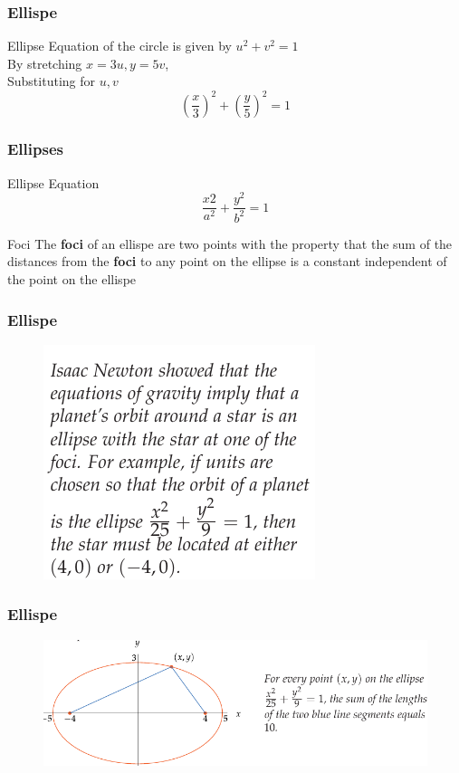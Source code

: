 \documentclass{beamer}
\begin{document}
 \begin{frame}
  \frametitle{Ellispe}
\begin{exampleblock}{Ellipse}
  Equation of the circle is given by \(u^{2} + v^{2} = 1\) \\
  By stretching \(x = 3u, y = 5v\), \\ Substituting for \(u,v\)  
  \[ \left( \frac{x}{3} \right)^{2} + \left(\frac{y}{5}\right)^{2} = 1 \]
\end{exampleblock} 
 
 \end{frame}
 \begin{frame}
  \frametitle{Ellipses}
  \begin{block}{Ellipse Equation}
    \[\frac{x{2}}{a^{2}} + \frac{y^{2}}{b^{2}} = 1 \] 
  \end{block}
  \begin{block}{Foci}
The \textbf{foci} of an ellispe are two points with the property that the
sum of the distances from the \textbf{foci} to any point on the ellipse is a constant independent of the point on the ellispe    
  \end{block} 
 
 \end{frame}

 \begin{frame}
  \frametitle{Ellispe}
  \begin{figure}
    \centering
    \includegraphics[scale=0.5]{ellipse1.png}
  \end{figure}
 \end{frame}

 \begin{frame}
  \frametitle{Ellispe}
  \begin{figure}
    \centering
    \includegraphics[scale=0.4]{foci.png}
  \end{figure}
 \end{frame}
\end{document}
